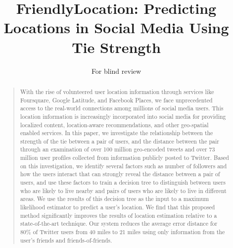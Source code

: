 \documentclass[letterpaper]{article}
\begin{document}
\title{FriendlyLocation: Predicting Locations in Social Media Using Tie Strength}
\author{For blind review}
\maketitle
\begin{abstract}
\begin{quote}
With the rise of volunteered user location information through services
like Foursquare, Google Latitude, and Facebook Places, we face unprecedented
access to the real-world connections among millions of social media users.
%
This location information is increasingly incorporated into social media for
providing localized content, location-aware recommendations, and other
geo-spatial enabled services.
%
In this paper, we investigate the relationship between the strength of the tie
between a pair of users, and the distance between the pair through an
examination of over 100 million geo-encoded tweets and
over 73 million user profiles collected from information publicly
posted to Twitter.
%
Based on this investigation, we identify several factors such as number of
followers and how the users interact that can strongly reveal the distance
between a pair of users, and use these factors to train a decision tree to
distinguish between users who are likely to live nearby and pairs of users who
are likely to live in different areas.
%
We use the results of this decision tree as the input to a maximum likelihood
estimator to predict a user's location.
%
We find that this proposed method significantly improves the results of
location estimation relative to a state-of-the-art technique.
%
Our system reduces the average error distance for 80\% of Twitter users from 40
miles to 21 miles using only information from the user's friends and
friends-of-friends.
\end{quote}
\end{abstract}







\end{document}
